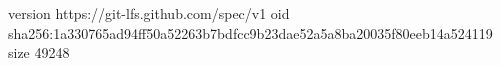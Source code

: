 version https://git-lfs.github.com/spec/v1
oid sha256:1a330765ad94ff50a52263b7bdfcc9b23dae52a5a8ba20035f80eeb14a524119
size 49248
